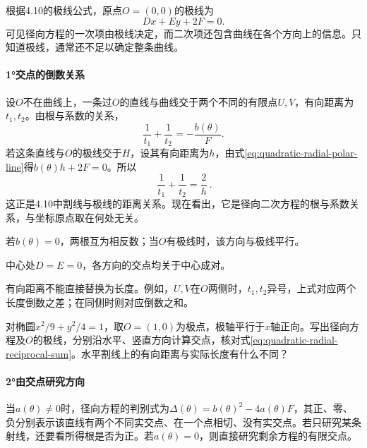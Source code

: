 根据4.10的极线公式，原点\(O=(0,0)\)的极线为
\begin{equation}\label{eq:quadratic-radial-polar-line}
 Dx+Ey+2F=0.
\end{equation}
可见径向方程的一次项由极线决定，而二次项还包含曲线在各个方向上的信息。只知道极线，通常还不足以确定整条曲线。

\paragraph{1°交点的倒数关系} \mbox{}

设\(O\)不在曲线上，一条过\(O\)的直线与曲线交于两个不同的有限点\(U,V\)，有向距离为\(t_1,t_2\)。由根与系数的关系，
\begin{equation}\label{eq:quadratic-radial-reciprocal-sum}
 \frac1{t_1}+\frac1{t_2}=-\frac{b(\theta)}F.
\end{equation}
若这条直线与\(O\)的极线交于\(H\)，设其有向距离为\(h\)，由式\eqref{eq:quadratic-radial-polar-line}得\(b(\theta)h+2F=0\)。所以
\begin{equation}\label{eq:quadratic-radial-harmonic-mean}
 \boxed{\ \frac1{t_1}+\frac1{t_2}=\frac2h\ }.
\end{equation}
这正是4.10中割线与极线的距离关系。现在看出，它是径向二次方程的根与系数关系，与坐标原点取在何处无关。

若\(b(\theta)=0\)，两根互为相反数；当\(O\)有极线时，该方向与极线平行。

中心处\(D=E=0\)，各方向的交点均关于中心成对。

有向距离不能直接替换为长度。例如，\(U,V\)在\(O\)两侧时，\(t_1,t_2\)异号，上式对应两个长度倒数之差；在同侧时则对应倒数之和。

\par\addvspace{6pt}\noindent\begin{minipage}{\linewidth}
\begin{example}
对椭圆\(x^2/9+y^2/4=1\)，取\(O=(1,0)\)为极点，极轴平行于\(x\)轴正向。写出径向方程及\(O\)的极线，分别沿水平、竖直方向计算交点，核对式\eqref{eq:quadratic-radial-reciprocal-sum}。水平割线上的有向距离与实际长度有什么不同？
\end{example}
\end{minipage}\par\addvspace{6pt}

\paragraph{2°由交点研究方向} \mbox{}

当\(a(\theta)\ne0\)时，径向方程的判别式为\(\Delta(\theta)=b(\theta)^2-4a(\theta)F\)，其正、零、负分别表示该直线有两个不同实交点、在一个点相切、没有实交点。若只研究某条射线，还要看所得根是否为正。若\(a(\theta)=0\)，则直接研究剩余方程的有限交点。

